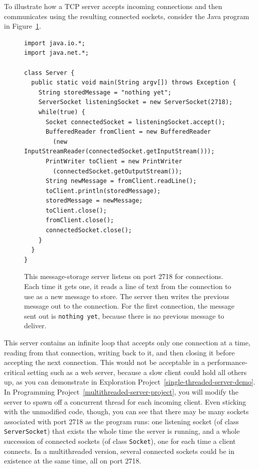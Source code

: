 To illustrate how a TCP server accepts incoming connections and then
communicates using the resulting connected sockets, consider the Java
program in Figure~\ref{Server-code}.
\begin{figure}
\begin{verbatim}
import java.io.*;
import java.net.*;

class Server {
  public static void main(String argv[]) throws Exception {
    String storedMessage = "nothing yet";
    ServerSocket listeningSocket = new ServerSocket(2718);
    while(true) {
      Socket connectedSocket = listeningSocket.accept();
      BufferedReader fromClient = new BufferedReader
        (new InputStreamReader(connectedSocket.getInputStream()));
      PrintWriter toClient = new PrintWriter
        (connectedSocket.getOutputStream());
      String newMessage = fromClient.readLine();
      toClient.println(storedMessage);
      storedMessage = newMessage;
      toClient.close();
      fromClient.close();
      connectedSocket.close();
    }
  }
}
\end{verbatim}
\caption{This message-storage server listens on port 2718 for
  connections.  Each time
it gets one, it reads a line of text from the connection to use as a
  new message to store.  The server
then writes the previous message out to the connection.  For the first
connection, the message sent out is {\tt nothing yet}, because there is no
previous message to deliver.}
\label{Server-code}
\end{figure}
This server contains an infinite loop that 
accepts only one connection at a time, reading from that
connection, writing back to it, and then closing it before accepting
the next connection.  This would not be acceptable in a
performance-critical setting such as a web server, because a slow client
could hold all others up, as you can demonstrate in Exploration Project~\ref{single-threaded-server-demo}.  In Programming
Project~\ref{multithreaded-server-project}, you will modify the server
to spawn off a concurrent thread for each incoming client.  Even sticking
with the unmodified code, though, you can see that there may be many
sockets associated with port 2718 as the program runs: one listening
socket (of class {\tt ServerSocket}) that exists the whole time the server
is running, and a whole succession of connected sockets (of class
{\tt Socket}), one for each time a client connects.  In a multithreaded
version, several connected sockets could be in existence at the same
time, all on port 2718.


